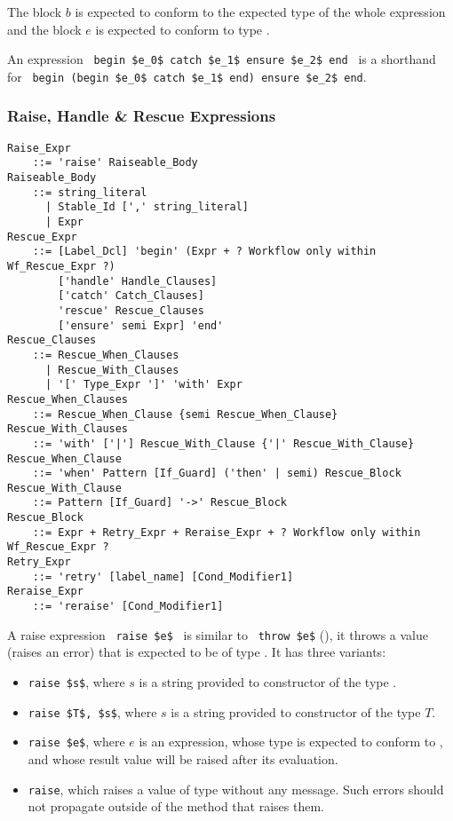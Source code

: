 The block $b$ is expected to conform to the expected type of the whole expression and the  block $e$ is expected to conform to type . 

An expression ~\lstinline!begin $e_0$ catch $e_1$ ensure $e_2$ end!~ is a shorthand for ~\lstinline!begin (begin $e_0$ catch $e_1$ end) ensure $e_2$ end!. 






\subsubsection{Raise, Handle \& Rescue Expressions}

\grammar\begin{lstlisting}
Raise_Expr
    ::= 'raise' Raiseable_Body
Raiseable_Body 
    ::= string_literal
      | Stable_Id [',' string_literal]
      | Expr
Rescue_Expr
    ::= [Label_Dcl] 'begin' (Expr + ? Workflow only within Wf_Rescue_Expr ?)
        ['handle' Handle_Clauses]
        ['catch' Catch_Clauses]
        'rescue' Rescue_Clauses
        ['ensure' semi Expr] 'end'
Rescue_Clauses 
    ::= Rescue_When_Clauses
      | Rescue_With_Clauses
      | '[' Type_Expr ']' 'with' Expr
Rescue_When_Clauses
    ::= Rescue_When_Clause {semi Rescue_When_Clause}
Rescue_With_Clauses
    ::= 'with' ['|'] Rescue_With_Clause {'|' Rescue_With_Clause}
Rescue_When_Clause 
    ::= 'when' Pattern [If_Guard] ('then' | semi) Rescue_Block
Rescue_With_Clause 
    ::= Pattern [If_Guard] '->' Rescue_Block
Rescue_Block
    ::= Expr + Retry_Expr + Reraise_Expr + ? Workflow only within Wf_Rescue_Expr ?
Retry_Expr
    ::= 'retry' [label_name] [Cond_Modifier1]
Reraise_Expr
    ::= 'reraise' [Cond_Modifier1]
\end{lstlisting}

A raise expression ~\lstinline!raise $e$!~ is similar to ~\lstinline!throw $e$! (), it throws a value (raises an error) that is expected to be of type . It has three variants: 
\begin{itemize}
  \item[] \lstinline!raise $s$!, where $s$ is a string provided to constructor of the type . 
  \item[] \lstinline!raise $T$, $s$!, where $s$ is a string provided to constructor of the type $T$. 
  \item[] \lstinline!raise $e$!, where $e$ is an expression, whose type is expected to conform to , and whose result value will be raised after its evaluation. 
  \item[] \lstinline!raise!, which raises a value of type  without any message. Such errors should not propagate outside of the method that raises them. 
\end{itemize}

